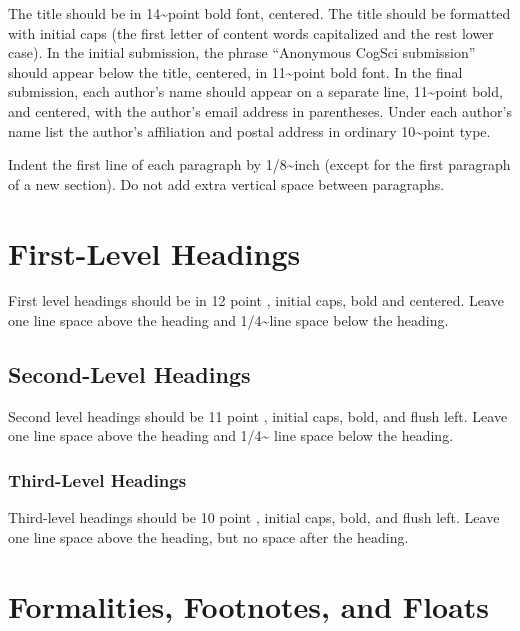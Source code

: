 \documentclass[10pt, letterpaper]{article}
\begin{document}
The title should be in 14\textasciitilde point bold font, centered. The
title should be formatted with initial caps (the first letter of content
words capitalized and the rest lower case). In the initial submission,
the phrase ``Anonymous CogSci submission'' should appear below the
title, centered, in 11\textasciitilde point bold font. In the final
submission, each author's name should appear on a separate line,
11\textasciitilde point bold, and centered, with the author's email
address in parentheses. Under each author's name list the author's
affiliation and postal address in ordinary 10\textasciitilde point type.

Indent the first line of each paragraph by 1/8\textasciitilde inch
(except for the first paragraph of a new section). Do not add extra
vertical space between paragraphs.

\hypertarget{first-level-headings}{%
\section{First-Level Headings}\label{first-level-headings}}

First level headings should be in 12 point , initial caps, bold and
centered. Leave one line space above the heading and
1/4\textasciitilde line space below the heading.

\hypertarget{second-level-headings}{%
\subsection{Second-Level Headings}\label{second-level-headings}}

Second level headings should be 11 point , initial caps, bold, and flush
left. Leave one line space above the heading and 1/4\textasciitilde{}
line space below the heading.

\hypertarget{third-level-headings}{%
\subsubsection{Third-Level Headings}\label{third-level-headings}}

Third-level headings should be 10 point , initial caps, bold, and flush
left. Leave one line space above the heading, but no space after the
heading.

\hypertarget{formalities-footnotes-and-floats}{%
\section{Formalities, Footnotes, and
Floats}\label{formalities-footnotes-and-floats}}
\end{document}
